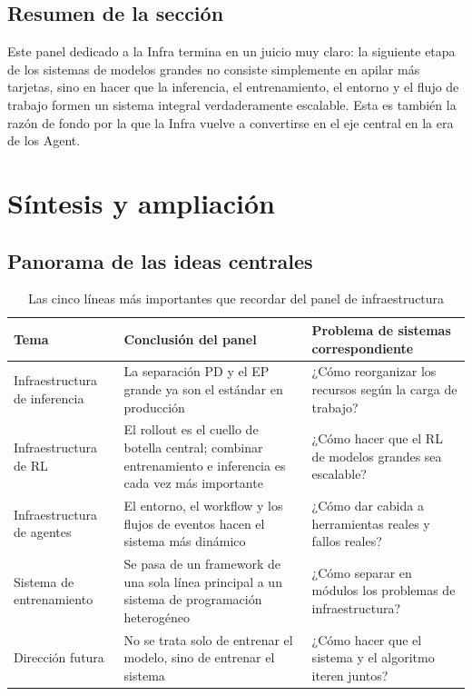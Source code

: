 \documentclass[a4paper]{article}
\begin{document}
\subsection{Resumen de la sección}
Este panel dedicado a la Infra termina en un juicio muy claro: la siguiente etapa de los sistemas de modelos grandes no consiste simplemente en apilar más tarjetas, sino en hacer que la inferencia, el entrenamiento, el entorno y el flujo de trabajo formen un sistema integral verdaderamente escalable. Esta es también la razón de fondo por la que la Infra vuelve a convertirse en el eje central en la era de los Agent.
\section{Síntesis y ampliación}

\subsection{Panorama de las ideas centrales}
\begin{table}[H]
\centering
\begin{tabular}{p{2.8cm}p{4.0cm}p{5.0cm}}
\toprule
\textbf{Tema} & \textbf{Conclusión del panel} & \textbf{Problema de sistemas correspondiente} \\
\midrule
Infraestructura de inferencia & La separación PD y el EP grande ya son el estándar en producción & ¿Cómo reorganizar los recursos según la carga de trabajo? \\
Infraestructura de RL & El rollout es el cuello de botella central; combinar entrenamiento e inferencia es cada vez más importante & ¿Cómo hacer que el RL de modelos grandes sea escalable? \\
Infraestructura de agentes & El entorno, el workflow y los flujos de eventos hacen el sistema más dinámico & ¿Cómo dar cabida a herramientas reales y fallos reales? \\
Sistema de entrenamiento & Se pasa de un framework de una sola línea principal a un sistema de programación heterogéneo & ¿Cómo separar en módulos los problemas de infraestructura? \\
Dirección futura & No se trata solo de entrenar el modelo, sino de entrenar el sistema & ¿Cómo hacer que el sistema y el algoritmo iteren juntos? \\
\bottomrule
\end{tabular}
\caption{Las cinco líneas más importantes que recordar del panel de infraestructura}
\end{table}
\end{document}
